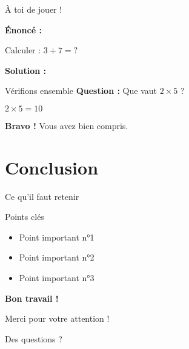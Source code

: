 \documentclass[14pt, xcolor={svgnames}]{beamer}
\begin{document}
\begin{frame}{À toi de jouer !}
  \begin{exobeamer}
    \textbf{Énoncé :}

    Calculer : $3 + 7 = ?$

    \pause
    \vspace{1em}

    \textbf{Solution :}

  \end{exobeamer}
\end{frame}

\begin{frame}{Vérifions ensemble}
  \textbf{Question :} Que vaut $2 \times 5$ ?

  \pause
  \vspace{2em}

  \begin{center}
    {\Huge \textcolor{college-main}{$2 \times 5 = 10$}}
  \end{center}

  \pause

  \textbf{Bravo !} Vous avez bien compris.
\end{frame}

\section{Conclusion}

\begin{frame}{Ce qu'il faut retenir}
  \begin{alertblock}{Points clés}
    \begin{itemize}
      \item Point important n°1
      \item Point important n°2
      \item Point important n°3
    \end{itemize}
  \end{alertblock}

  \vfill

  \begin{center}
    \textcolor{college-accent}{\textbf{Bon travail !}}
  \end{center}
\end{frame}

\begin{frame}
  \begin{center}
    {\Huge Merci pour votre attention !}

    \vspace{2em}

    {\large Des questions ?}
  \end{center}
\end{frame}
\end{document}
